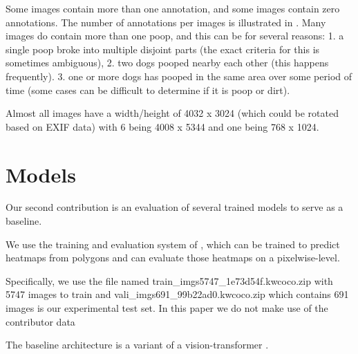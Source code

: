 \documentclass[10pt,twocolumn,letterpaper]{article}
\begin{document}
Some images contain more than one annotation, and some images contain zero annotations.
The number of annotations per images is illustrated in .
Many images do contain more than one poop, and this can be for several reasons:
    1. a single poop broke into multiple disjoint parts (the exact criteria for this is sometimes ambiguous), 
    2. two dogs pooped nearby each other (this happens frequently). 
    3. one or more dogs has pooped in the same area over some period of
       time (some cases can be difficult to determine if it is poop or dirt).

Almost all images have a width/height of 4032 x 3024 (which could be rotated
based on EXIF data) with 6 being 4008 x 5344 and one being 768 x 1024.


\section{Models}

Our second contribution is an evaluation of several trained models to serve as
a baseline.

We use the training and evaluation system of \cite{Greenwell_2024_WACV}, which
can be trained to predict heatmaps from polygons and can evaluate those
heatmaps on a pixelwise-level. 


Specifically, we use the file named train\_imgs5747\_1e73d54f.kwcoco.zip with
5747 images to train and vali\_imgs691\_99b22ad0.kwcoco.zip which contains 691
images is our experimental test set.
In this paper we do not make use of the contributor data


The baseline architecture is a variant \cite{bertasius2021space,Greenwell_2024_WACV} of a vision-transformer \cite{dosovitskiy_image_2021}.
\end{document}
